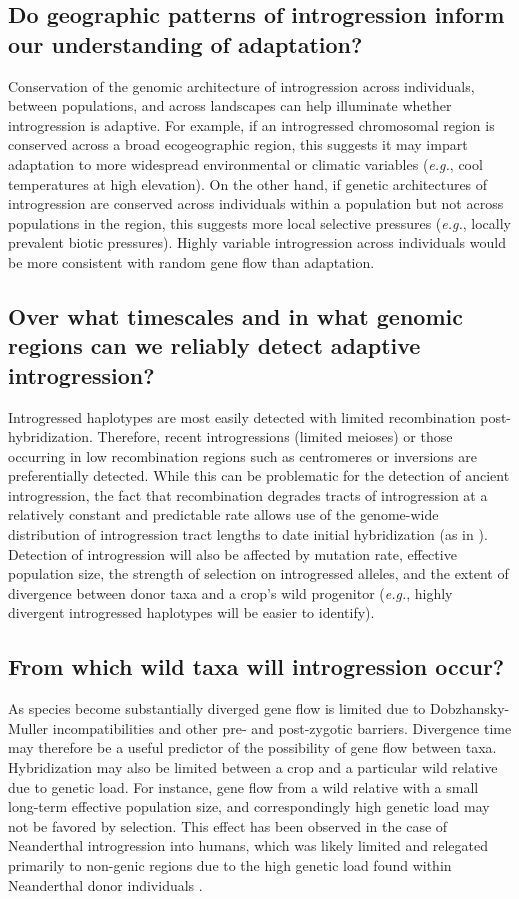 \documentclass[11pt]{article}
\begin{document}
{\subsection*{Do geographic patterns of introgression inform our understanding of adaptation?}
Conservation of the genomic architecture of introgression across individuals,  between populations, and across landscapes can help illuminate whether introgression is adaptive.
For example, if an introgressed chromosomal region is conserved across a broad ecogeographic region, this suggests it may impart adaptation to more widespread environmental or climatic variables (\emph{e.g.}, cool temperatures at high elevation).
On the other hand, if genetic architectures of introgression are conserved across individuals within a population but not across populations in the region, this suggests more local selective pressures (\emph{e.g.}, locally prevalent biotic pressures).
Highly variable introgression across individuals would be more consistent with random gene flow than adaptation.

\subsection*{Over what timescales and in what genomic regions can we reliably detect adaptive introgression?}
Introgressed haplotypes are most easily detected with limited recombination post-hybridization.
Therefore, recent introgressions (limited meioses) or those occurring in low recombination regions such as centromeres or inversions are preferentially detected.
While this can be problematic for the detection of ancient introgression, the fact that recombination degrades tracts of introgression at a relatively constant and predictable rate allows use of the genome-wide distribution of introgression tract lengths to date initial hybridization (as in \citealt{Poets2015}).
Detection of introgression will also be affected by mutation rate, effective population size, the strength of selection on introgressed alleles, and the extent of divergence between donor taxa and a crop's wild progenitor (\emph{e.g.}, highly divergent introgressed haplotypes will be easier to identify).

\subsection*{From which wild taxa will introgression occur?}
As species become substantially diverged gene flow is limited due to Dobzhansky-Muller incompatibilities and other pre- and post-zygotic barriers.
Divergence time may therefore be a useful predictor of the possibility of gene flow between taxa.
Hybridization may also be limited between a crop and a particular wild relative due to genetic load. 
For instance, gene flow from a wild relative with a small long-term effective population size, and correspondingly high genetic load may not be favored by selection.
This effect has been observed in the case of Neanderthal introgression into humans, which was likely limited and relegated primarily to non-genic regions due to the high genetic load found within Neanderthal donor individuals \citep{harris2016genetic}.

}
\end{document}
